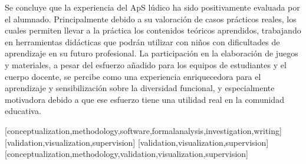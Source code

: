 \documentclass[spanish]{textolivre}
\begin{document}
Se concluye que la experiencia del ApS lúdico ha sido positivamente evaluada por el alumnado. Principalmente debido a su valoración de casos prácticos reales, los cuales permiten llevar a la práctica los contenidos teóricos aprendidos, trabajando en herramientas didácticas que podrán utilizar con niños con dificultades de aprendizaje en su futuro profesional. La participación en la elaboración de juegos y materiales, a pesar del esfuerzo añadido para los equipos de estudiantes y el cuerpo docente, se percibe como una experiencia enriquecedora para el aprendizaje y sensibilización sobre la diversidad funcional, y especialmente motivadora debido a que ese esfuerzo tiene una utilidad real en la comunidad educativa.


\printbibliography\label{sec-bib}


\begin{contributors}
[conceptualization,methodology,software,formalanalysis,investigation,writing]
[validation,visualization,supervision]
[validation,visualization,supervision]
[conceptualization,methodology,validation,visualization,supervision]
\end{contributors}


\appendix 
\end{document}
